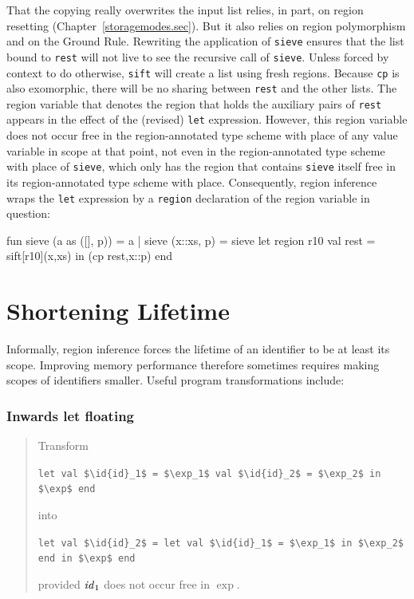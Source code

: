\documentclass[12pt]{book}
\begin{document}
That the copying really overwrites the input list relies, in part, on region
resetting (Chapter~\ref{storagemodes.sec}).  But it also relies on region
polymorphism and on the Ground Rule.  Rewriting the application of
\lstinline{sieve} ensures that the list bound to \lstinline{rest} will not live
to see the recursive call of \lstinline{sieve}.  Unless forced by context to do
otherwise, \lstinline{sift} will create a list using fresh regions. Because
\lstinline{cp} is also
%
%
exomorphic, there will be no sharing between \lstinline{rest} and the other
lists. The region variable that denotes the region that holds the auxiliary
pairs of \lstinline{rest} appears in the effect of the (revised) \lstinline{let}
expression. However, this region variable does not occur free in the
region-annotated type scheme with place of any value variable in scope at that
point, not even in the region-annotated type scheme with place of
\lstinline{sieve}, which only has the region that contains \lstinline{sieve}
itself free in its region-annotated type scheme with place.  Consequently,
region inference wraps the \lstinline{let} expression by a \lstinline{region}
declaration of the region variable in question:
\begin{smlcode}
  fun sieve (a as ([], p)) = a
    | sieve (x::xs, p) =
        sieve let region r10
                  val rest = sift[r10](x,xs)
              in (cp rest,x::p)
              end
\end{smlcode}

\section{Shortening Lifetime}
Informally, region inference forces the lifetime of an identifier to be at least
its scope. Improving memory performance therefore sometimes requires making
scopes of identifiers smaller.  Useful
%
%
%
%
%
program transformations include:

\subsubsection*{Inwards let floating}
\begin{quote}
%
Transform
\begin{center}
  \lstinline!let val $\id{id}_1$ = $\exp_1$ val $\id{id}_2$ = $\exp_2$ in $\exp$ end!
\end{center}
into
\begin{center}
  \lstinline!let val $\id{id}_2$ = let val $\id{id}_1$ = $\exp_1$ in $\exp_2$ end in $\exp$ end!
\end{center}
provided ${\it id}_1$ does not occur free in $\exp$.
\end{quote}
\end{document}

